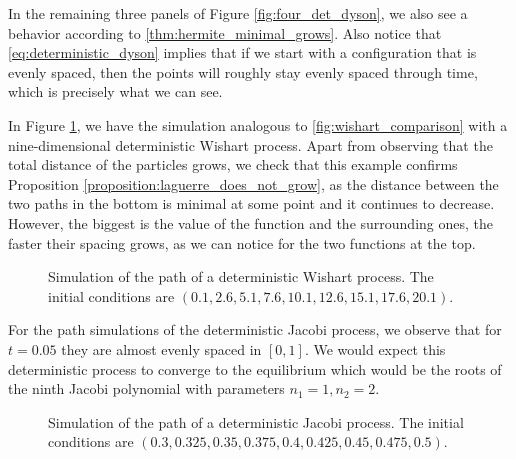 In the remaining three panels of Figure \ref{fig:four_det_dyson}, we also see a behavior according to \ref{thm:hermite_minimal_grows}. Also notice that \eqref{eq:deterministic_dyson} implies that if we start with a configuration that is evenly spaced, then the points will roughly stay evenly spaced through time, which is precisely what we can see. 

In Figure \ref{fig:det_wishart}, we have the simulation analogous to \ref{fig:wishart_comparison} with a nine-dimensional deterministic Wishart process. Apart from observing that the total distance of the particles grows, we check that this example confirms Proposition \ref{proposition:laguerre_does_not_grow}, as the distance between the two paths in the bottom is minimal at some point and it continues to decrease. However, the biggest is the value of the function and the surrounding ones, the faster their spacing grows, as we can notice for the two functions at the top.

\begin{figure}[h!] \centering 
    
    \caption{Simulation of the path of a deterministic Wishart process. The initial conditions are $(0.1,2.6,5.1,7.6,10.1,12.6,15.1,17.6,20.1)$.\label{fig:det_wishart}}
\end{figure}

For the path simulations of the deterministic Jacobi process, we observe that for $t=0.05$ they are almost evenly spaced in $[0,1]$. We would expect this deterministic process to converge to the equilibrium which would be the roots of the ninth Jacobi polynomial with parameters $n_1 = 1, n_2 =2$. 

\begin{figure}[h!] \centering 
    
    \caption{Simulation of the path of a deterministic Jacobi process. The initial conditions are $(0.3,0.325,0.35,0.375,0.4,0.425,0.45,0.475,0.5)$.\label{fig:det_jacobi}}
\end{figure}

